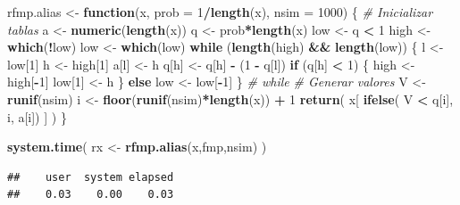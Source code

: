 \documentclass[]{book}
\newenvironment{Shaded}{\begin{snugshade}}{\end{snugshade}}
\newcommand{\KeywordTok}[1]{\textcolor[rgb]{0.13,0.29,0.53}{\textbf{#1}}}
\newcommand{\DataTypeTok}[1]{\textcolor[rgb]{0.13,0.29,0.53}{#1}}
\newcommand{\DecValTok}[1]{\textcolor[rgb]{0.00,0.00,0.81}{#1}}
\newcommand{\StringTok}[1]{\textcolor[rgb]{0.31,0.60,0.02}{#1}}
\newcommand{\CommentTok}[1]{\textcolor[rgb]{0.56,0.35,0.01}{\textit{#1}}}
\newcommand{\ControlFlowTok}[1]{\textcolor[rgb]{0.13,0.29,0.53}{\textbf{#1}}}
\newcommand{\OperatorTok}[1]{\textcolor[rgb]{0.81,0.36,0.00}{\textbf{#1}}}
\newcommand{\NormalTok}[1]{#1}
\theoremstyle{definition}
\theoremstyle{definition}
\theoremstyle{definition}
\theoremstyle{remark}
\begin{document}
\begin{Shaded}
\begin{Highlighting}[]
\NormalTok{rfmp.alias <-}\StringTok{ }\ControlFlowTok{function}\NormalTok{(x, }\DataTypeTok{prob =} \DecValTok{1}\OperatorTok{/}\KeywordTok{length}\NormalTok{(x), }\DataTypeTok{nsim =} \DecValTok{1000}\NormalTok{) \{}
  \CommentTok{# Inicializar tablas}
\NormalTok{  a <-}\StringTok{ }\KeywordTok{numeric}\NormalTok{(}\KeywordTok{length}\NormalTok{(x))}
\NormalTok{  q <-}\StringTok{ }\NormalTok{prob}\OperatorTok{*}\KeywordTok{length}\NormalTok{(x)}
\NormalTok{  low <-}\StringTok{ }\NormalTok{q }\OperatorTok{<}\StringTok{ }\DecValTok{1}
\NormalTok{  high <-}\StringTok{ }\KeywordTok{which}\NormalTok{(}\OperatorTok{!}\NormalTok{low)}
\NormalTok{  low <-}\StringTok{ }\KeywordTok{which}\NormalTok{(low)}
  \ControlFlowTok{while}\NormalTok{ (}\KeywordTok{length}\NormalTok{(high) }\OperatorTok{&&}\StringTok{ }\KeywordTok{length}\NormalTok{(low)) \{}
\NormalTok{    l <-}\StringTok{ }\NormalTok{low[}\DecValTok{1}\NormalTok{]}
\NormalTok{    h <-}\StringTok{ }\NormalTok{high[}\DecValTok{1}\NormalTok{]}
\NormalTok{    a[l] <-}\StringTok{ }\NormalTok{h}
\NormalTok{    q[h] <-}\StringTok{ }\NormalTok{q[h] }\OperatorTok{-}\StringTok{ }\NormalTok{(}\DecValTok{1} \OperatorTok{-}\StringTok{ }\NormalTok{q[l])}
    \ControlFlowTok{if}\NormalTok{ (q[h] }\OperatorTok{<}\StringTok{ }\DecValTok{1}\NormalTok{) \{}
\NormalTok{      high <-}\StringTok{ }\NormalTok{high[}\OperatorTok{-}\DecValTok{1}\NormalTok{]}
\NormalTok{      low[}\DecValTok{1}\NormalTok{] <-}\StringTok{ }\NormalTok{h}
\NormalTok{    \} }\ControlFlowTok{else}\NormalTok{ low <-}\StringTok{ }\NormalTok{low[}\OperatorTok{-}\DecValTok{1}\NormalTok{]}
\NormalTok{  \} }\CommentTok{# while}
  \CommentTok{# Generar valores}
\NormalTok{  V <-}\StringTok{ }\KeywordTok{runif}\NormalTok{(nsim)}
\NormalTok{  i <-}\StringTok{ }\KeywordTok{floor}\NormalTok{(}\KeywordTok{runif}\NormalTok{(nsim)}\OperatorTok{*}\KeywordTok{length}\NormalTok{(x)) }\OperatorTok{+}\StringTok{ }\DecValTok{1}
  \KeywordTok{return}\NormalTok{( x[ }\KeywordTok{ifelse}\NormalTok{( V }\OperatorTok{<}\StringTok{ }\NormalTok{q[i], i, a[i]) ] )}
\NormalTok{\}}


\KeywordTok{system.time}\NormalTok{( rx <-}\StringTok{ }\KeywordTok{rfmp.alias}\NormalTok{(x,fmp,nsim) )}
\end{Highlighting}
\end{Shaded}

\begin{verbatim}
##    user  system elapsed 
##    0.03    0.00    0.03
\end{verbatim}
\end{document}
